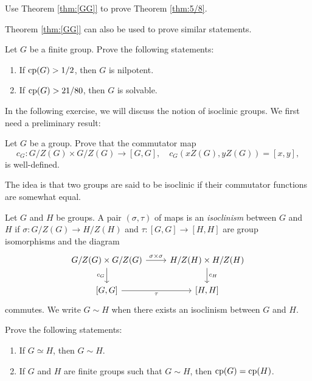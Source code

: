 \begin{exercise}
    \label{xca:5/8}
    Use Theorem \ref{thm:[GG]} to prove Theorem \ref{thm:5/8}.
\end{exercise}

Theorem \ref{thm:[GG]} 
can also be used to
prove similar statements. 

\begin{exercise}
    \label{xca:cp_NS}
    Let $G$ be a finite group. Prove the following statements:
    \begin{enumerate}
        \item If $\operatorname{cp}(G)>1/2$, then $G$ is nilpotent.
        \item If $\operatorname{cp}(G)>21/80$, then $G$ is solvable. 
    \end{enumerate}
\end{exercise}

In the following exercise, we will discuss the notion 
of isoclinic groups. We first need
a preliminary result:

\begin{exercise}
\label{xca:commutator_map}
    Let $G$ be a group. Prove that the commutator map
    \[
    c_G\colon G/Z(G)\times G/Z(G)\to [G,G],
    \quad
    c_G(xZ(G),yZ(G))=[x,y],
    \]
    is well-defined. 
\end{exercise}

The idea is that two groups are said to be isoclinic 
if their commutator functions are somewhat equal. 

\begin{exercise}
\label{xca:isoclinism}
    Let $G$ and $H$ be groups. 
    A pair $(\sigma,\tau)$ of maps is an \emph{isoclinism}
    between $G$ and $H$ if 
    $\sigma\colon G/Z(G)\to H/Z(H)$ and  
    $\tau\colon [G,G]\to [H,H]$ are group isomorphisms and 
    the diagram
    \begin{equation}
    \label{eq:isoclinism}
    \begin{tikzcd}
	{G/Z(G)\times G/Z(G)} & {H/Z(H)\times H/Z(H)} \\
	{[G,G]} & {[H,H]}
	\arrow["{\sigma\times\sigma }", from=1-1, to=1-2]
	\arrow["{c_H}", from=1-2, to=2-2]
	\arrow["{c_G}"', from=1-1, to=2-1]
	\arrow["\tau"', from=2-1, to=2-2]
    \end{tikzcd}
    \end{equation} 
    commutes. We write $G\sim H$ when there exists 
    an isoclinism between $G$ and $H$. 
    
    Prove the following statements:
    \begin{enumerate}
        \item If $G\simeq H$, then $G\sim H$.
        \item If $G$ and $H$ are finite groups such that $G\sim H$, then $\operatorname{cp}(G)=\operatorname{cp}(H)$. 
    \end{enumerate}
\end{exercise}

